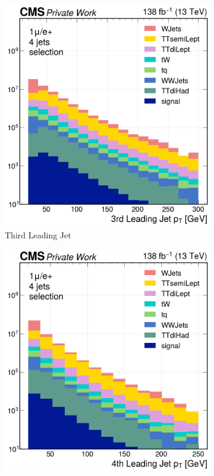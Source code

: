 \begin{figure}[H]
    \ContinuedFloat
    \centering
    \begin{subfigure}{0.42\linewidth}
        \includegraphics[width=\linewidth]{fig//chap07-selection/selection/Third_Leading_Jet_pt.png}
         \caption{Third Leading Jet}
     \end{subfigure}
    \begin{subfigure}{0.42\linewidth}
        \includegraphics[width=\linewidth]{fig//chap07-selection/selection/Fourth_Leading_Jet_pt.png}

\end{subfigure}
\end{figure}
